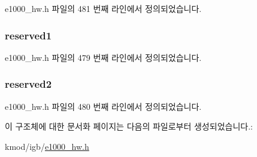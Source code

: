 e1000\+\_\+hw.\+h 파일의 481 번째 라인에서 정의되었습니다.

\subsubsection[{\texorpdfstring{reserved1}{reserved1}}]{ reserved1}\hypertarget{structe1000__host__mng__command__header_a04bb2d56146c948328208580316909cb}{}\label{structe1000__host__mng__command__header_a04bb2d56146c948328208580316909cb}


e1000\+\_\+hw.\+h 파일의 479 번째 라인에서 정의되었습니다.

\subsubsection[{\texorpdfstring{reserved2}{reserved2}}]{ reserved2}\hypertarget{structe1000__host__mng__command__header_abb0880e72f68cfaf6a809f9e12d88e61}{}\label{structe1000__host__mng__command__header_abb0880e72f68cfaf6a809f9e12d88e61}


e1000\+\_\+hw.\+h 파일의 480 번째 라인에서 정의되었습니다.



이 구조체에 대한 문서화 페이지는 다음의 파일로부터 생성되었습니다.\+:\begin{DoxyCompactItemize}
\item 
kmod/igb/\hyperlink{kmod_2igb_2e1000__hw_8h}{e1000\+\_\+hw.\+h}\end{DoxyCompactItemize}
